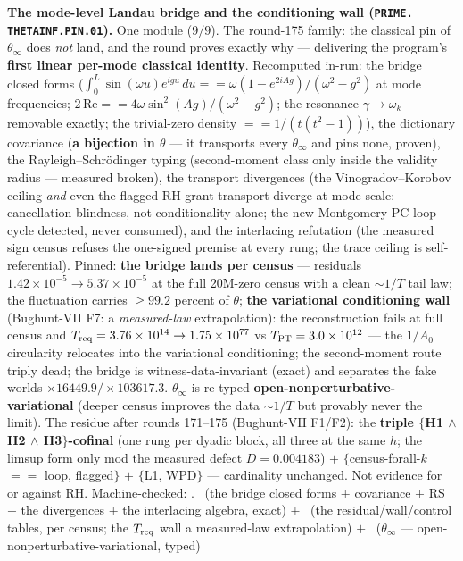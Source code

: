 \par\smallskip\noindent\textbf{The mode-level Landau bridge and
the conditioning wall (\texttt{PRIME.\allowbreak
THETAINF.\allowbreak PIN.01}).}
One module ($9/9$).  The round-175 family: the classical pin of
$\theta_\infty$ does \emph{not} land, and the round proves
exactly why --- delivering the program's \textbf{first linear
per-mode classical identity}.  Recomputed in-run: the bridge
closed forms ($\int_0^L \sin(\omega u)e^{igu}\,du ==
\omega(1 - e^{2iAg})/(\omega^2 - g^2)$ at mode frequencies;
$2\,\mathrm{Re} == 4\omega\sin^2(Ag)/(\omega^2 - g^2)$; the
resonance $\gamma \to \omega_k$ removable exactly; the
trivial-zero density $== 1/(t(t^2 - 1))$), the dictionary
covariance (\textbf{a bijection in $\theta$} --- it transports
every $\theta_\infty$ and pins none, proven), the
Rayleigh--Schr\"odinger typing (second-moment class only inside
the validity radius --- measured broken), the transport
divergences (the Vinogradov--Korobov ceiling \emph{and} even the
flagged RH-grant transport diverge at mode scale:
cancellation-blindness, not conditionality alone; the new
Montgomery-PC loop cycle detected, never consumed), and the
interlacing refutation (the measured sign census refuses the
one-signed premise at every rung; the trace ceiling is
self-referential).  Pinned: \textbf{the bridge lands per census}
--- residuals $1.42\times10^{-5} \to 5.37\times10^{-5}$ at the
full 20M-zero census with a clean ${\sim}1/T$ tail law; the
fluctuation carries $\ge 99.2$ percent of $\theta$;
\textbf{the variational conditioning wall} (Bughunt-VII F7: a
\emph{measured-law} extrapolation): the reconstruction fails at
full census and $T_{\rm req} = 3.76\times10^{14} \to
1.75\times10^{77}$ vs $T_{\rm PT} = 3.0\times10^{12}$ --- the
$1/A_0$ circularity relocates into the variational conditioning;
the second-moment route triply dead; the bridge is
witness-data-invariant (exact) and separates the fake worlds
$\times 16449.9/\times 103617.3$.  $\theta_\infty$ is re-typed
\textbf{open-nonperturbative-variational} (deeper census
improves the data ${\sim}1/T$ but provably never the limit).
The residue after rounds 171--175 (Bughunt-VII F1/F2): the
\textbf{triple $\{$H1 $\wedge$ H2 $\wedge$ H3$\}$-cofinal} (one
rung per dyadic block, all three at the same $h$; the limsup
form only mod the measured defect $D = 0.004183$) $+$
$\{$census-forall-$k$ $==$ loop, flagged$\}$ $+$ $\{$L1,
WPD$\}$ --- cardinality unchanged.  Not evidence for or against
RH.
Machine-checked: .
\mE\ (the bridge closed forms $+$ covariance $+$ RS $+$ the
divergences $+$ the interlacing algebra, exact) $+$ \mC\ (the
residual/wall/control tables, per census; the $T_{\rm req}$ wall
a measured-law extrapolation) $+$ \mO\ ($\theta_\infty$ ---
open-nonperturbative-variational, typed)
\par\smallskip


